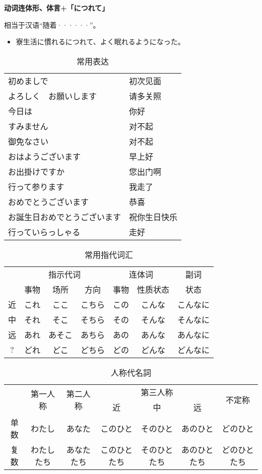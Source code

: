 {\bf
\noindent 动词连体形、体言+「につれて」
}

相当于汉语``随着······''。
\begin{itemize}
  \item 寮生活に慣れるにつれて、よく眠れるようになった。
\end{itemize}

\begin{table}[h]
  \centering
  \caption{常用表达}
  \label{tab:label}
  \small
  \begin{tabular}{ll}
    初めましで & 初次见面 \\
    よろしく　お願いします & 请多关照 \\
    今日は & 你好 \\
    すみません & 对不起 \\
    御免なさい & 对不起 \\
    おはようございます & 早上好 \\
    お出掛けですか & 您出门啊 \\
    行って参ります & 我走了 \\
    おめでとうございます & 恭喜 \\
    お誕生日おめでとうございます & 祝你生日快乐 \\
    行っていらっしゃる & 走好 \\
  \end{tabular}
\end{table}

\begin{table}[h]
  \centering
  \caption{常用指代词汇}
  \label{tab:label}
  \small
  \begin{tabular}{c|ccc|cc|c}
    & \multicolumn{3}{c|}{指示代词} & \multicolumn{2}{c|}{连体词} & 副词 \\
    & 事物 & 场所 & 方向 & 事物 & 性质状态 & 状态 \\
    \hline
    近 & これ & ここ   & こちら & この & こんな & こんなに \\
    中 & それ & そこ   & そちら & その & そんな & そんなに \\
    远 & あれ & あそこ & あちら & あの & あんな & あんなに \\
    ?  & どれ & どこ   & どちら & どの & どんな & どんなに \\
  \end{tabular}
\end{table}

\begin{table}[h]
  \centering
  \caption{人称代名詞}
  \label{tab:label}
  \small
  \begin{tabular}{c|c|c|ccc|c}
    & \multirow{2}{*}{第一人称} & \multirow{2}{*}{第二人称} & \multicolumn{3}{c|}{第三人称} & \multirow{2}{*}{不定称} \\
    & & & 近 & 中 & 远 & \\
    \hline
    单数 & わたし & あなた & このひと & そのひと & あのひと & どのひと \\
    复数 &わたしたち & あなたたち & このひとたち & そのひとたち & あのひとたち & どのひとたち \\
  \end{tabular}
\end{table}


